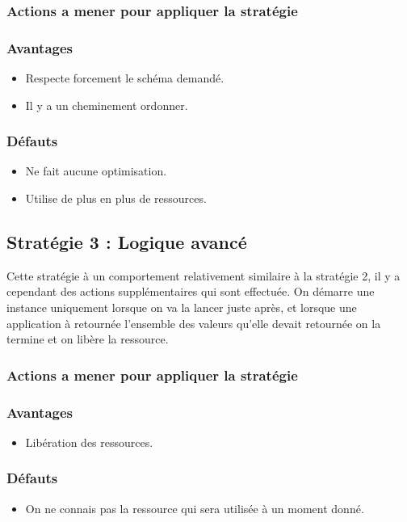 \documentclass{article}
\begin{document}
\subsubsection{Actions a mener pour appliquer la stratégie}

\subsubsection{Avantages}
\begin{itemize}
    \item Respecte forcement le schéma demandé.
    \item Il y a un cheminement ordonner.
\end{itemize}

\subsubsection{Défauts}
\begin{itemize}
    \item Ne fait aucune optimisation.
    \item Utilise de plus en plus de ressources.
\end{itemize}

\subsection{Stratégie 3 : Logique avancé}
Cette stratégie à un comportement relativement similaire à la stratégie 2, il y a cependant des actions supplémentaires qui sont effectuée. On démarre une instance uniquement lorsque on va la lancer juste après, et lorsque une application à retournée l'ensemble des valeurs qu'elle devait retournée on la termine et on libère la ressource.
\subsubsection{Actions a mener pour appliquer la stratégie}

\subsubsection{Avantages}
\begin{itemize}
    \item Libération des ressources.
\end{itemize}

\subsubsection{Défauts}
\begin{itemize}
    \item On ne connais pas la ressource qui sera utilisée à un moment donné.
\end{itemize}
\end{document}
